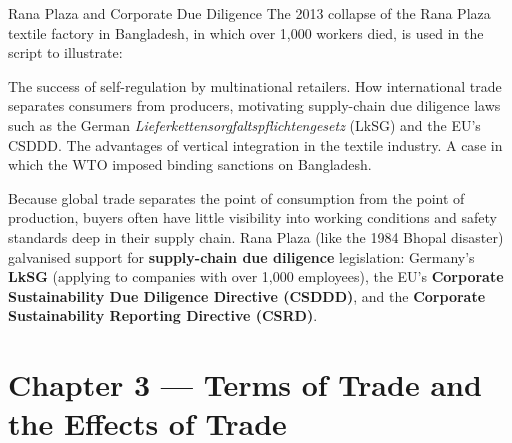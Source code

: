 \begin{question}[type=mc]{Rana Plaza and Corporate Due Diligence}
The 2013 collapse of the Rana Plaza textile factory in Bangladesh, in which
over 1,000 workers died, is used in the script to illustrate:
\begin{choices}
  \choice        The success of self-regulation by multinational retailers.
  \correctchoice How international trade separates consumers from producers,
                 motivating supply-chain due diligence laws such as the
                 German \emph{Lieferkettensorgfaltspflichtengesetz} (LkSG)
                 and the EU's CSDDD.
  \choice        The advantages of vertical integration in the textile
                 industry.
  \choice        A case in which the WTO imposed binding sanctions on
                 Bangladesh.
\end{choices}
\begin{solution}
  Because global trade separates the point of consumption from the point of
  production, buyers often have little visibility into working conditions
  and safety standards deep in their supply chain. Rana Plaza (like the 1984
  Bhopal disaster) galvanised support for \textbf{supply-chain due diligence}
  legislation: Germany's \textbf{LkSG} (applying to companies with over
  1,000 employees), the EU's \textbf{Corporate Sustainability Due Diligence
  Directive (CSDDD)}, and the \textbf{Corporate Sustainability Reporting
  Directive (CSRD)}.
\end{solution}
\end{question}


\section{Chapter 3 — Terms of Trade and the Effects of Trade}

